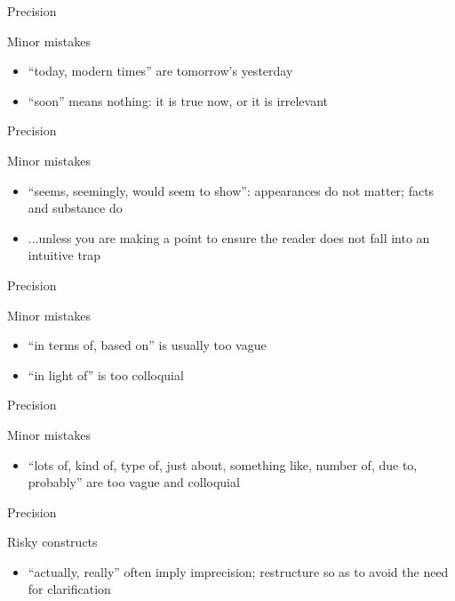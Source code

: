 \documentclass{beamer}
\begin{document}
\begin{frame}{Precision}
\begin{block}{Minor mistakes}
\begin{itemize}
\item ``today, modern times'' are tomorrow's yesterday
\item ``soon'' means nothing: it is true now, or it is irrelevant
\end{itemize}
\end{block}
\end{frame}

\begin{frame}{Precision}
\begin{block}{Minor mistakes}
\begin{itemize}
\item ``seems, seemingly, would seem to show'': appearances do not matter; facts and substance do
\item ...unless you are making a point to ensure the reader does not fall into an intuitive trap
\end{itemize}
\end{block}
\end{frame}

\begin{frame}{Precision}
\begin{block}{Minor mistakes}
\begin{itemize}
\item ``in terms of, based on'' is usually too vague
\item ``in light of'' is too colloquial
\end{itemize}
\end{block}
\end{frame}

\begin{frame}{Precision}
\begin{block}{Minor mistakes}
\begin{itemize}
\item ``lots of, kind of, type of, just about, something like, number of, due to, probably'' are too vague and colloquial
\end{itemize}
\end{block}
\end{frame}

\begin{frame}{Precision}
\begin{block}{Risky constructs}
\begin{itemize}
\item ``actually, really'' often imply imprecision; restructure so as to avoid the need for clarification
\end{itemize}
\end{block}
\end{frame}
\end{document}
